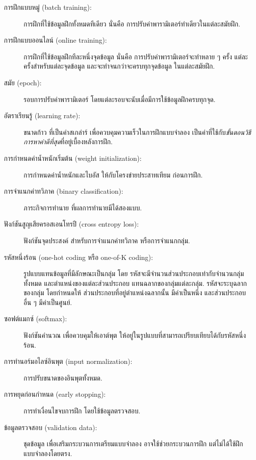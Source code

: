 \begin{description}
\item[การฝึกแบบหมู่ (batch training):]
การฝึกที่ใช้ข้อมูลฝึกทั้งหมดทีเดียว
นั่นคือ การปรับค่าพารามิเตอร์ทำเดียวในแต่ละสมัยฝึก.

\item[การฝึกแบบออนไลน์ (online training):]
การฝึกที่ใช้ข้อมูลฝึกทีละหนึ่งจุดข้อมูล
นั่นคือ การปรับค่าพารามิเตอร์จะทำหลาย ๆ ครั้ง
แต่ละครั้งสำหรับแต่ละจุดข้อมูล
และจะทำจนกว่าจะครบทุกจุดข้อมูล ในแต่ละสมัยฝึก.

\item[สมัย (epoch):]
รอบการปรับค่าพารามิเตอร์
โดยแต่ละรอบจะนับเมื่อมีการใช้ข้อมูลฝึกครบทุกจุด.

\item[อัตราเรียนรู้ (learning rate):]
ขนาดก้าว ที่เป็นค่าสเกล่าร์
เพื่อควบคุมความเร็วในการฝึกแบบจำลอง
เป็นค่าที่ใช้กับ\textit{ขั้นตอนวิธีการหาค่าดีที่สุด}ที่อยู่เบื้องหลังการฝึก.

\item[การกำหนดค่าน้ำหนักเริ่มต้น (weight initialization):]
การกำหนดค่าน้ำหนักและไบอัส
ให้กับโครงข่ายประสาทเทียม ก่อนการฝึก.

\item[การจำแนกค่าทวิภาค (binary classification):]
ภาระกิจการทำนาย ที่ผลการทำนายมีได้สองแบบ.

\item[ฟังก์ชันสูญเสียครอสเอนโทรปี (cross entropy loss):]
ฟังก์ชันจุดประสงค์
สำหรับการจำแนกค่าทวิภาค หรือการจำแนกกลุ่ม.

\item[รหัสหนึ่งร้อน (one-hot coding หรือ one-of-K coding):]
รูปแบบแทนข้อมูลที่มีลักษณะเป็นกลุ่ม
โดย รหัสจะมีจำนวนส่วนประกอบเท่ากับจำนวนกลุ่มทั้งหมด
และตำแหน่งของแต่ละส่วนประกอบ
แทนฉลากของกลุ่มแต่ละกลุ่ม.
รหัสจะระบุฉลากของกลุ่ม โดยกำหนดให้
ส่วนประกอบที่อยู่ตำแหน่งฉลากนั้น 
มีค่าเป็นหนึ่ง
และส่วนประกอบอื่น ๆ มีค่าเป็นศูนย์.

\item[ซอฟต์แมกซ์ (softmax):]
ฟังก์ชันคำนวณ เพื่อควบคุมให้เอาต์พุต
ให้อยู่ในรูปแบบที่สามารถเปรียบเทียบได้กับรหัสหนึ่งร้อน.

\item[การทำนอร์มอไลซ์อินพุต (input normalization):]
การปรับขนาดของอินพุตทั้งหมด.

\item[การหยุดก่อนกำหนด (early stopping):]
การทำเงื่อนไขจบการฝึก
โดยใช้ข้อมูลตรวจสอบ.


\item[ข้อมูลตรวจสอบ (validation data):]
ชุดข้อมูล
เพื่อเสริมกระบวนการเตรียมแบบจำลอง
อาจใช้ช่วยกระบวนการฝึก
แต่ไม่ได้ใช้ฝึกแบบจำลองโดยตรง.

	
\end{description}





